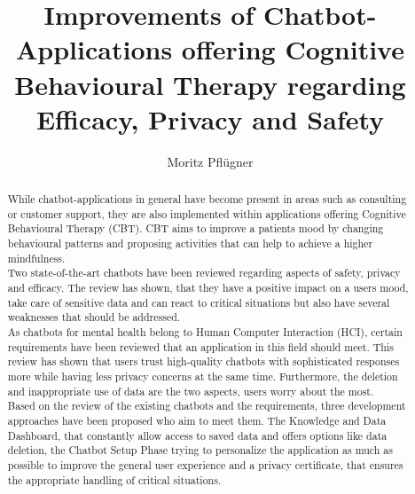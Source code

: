 \documentclass[sigconf, nonacm]{acmart}
\begin{document}
\graphicspath{ {./images/} }

\title{Improvements of Chatbot-Applications offering Cognitive Behavioural Therapy regarding Efficacy, Privacy and Safety}

\author{Moritz Pflügner}


\begin{abstract}
While chatbot-applications in general have become present in areas such as consulting or customer support, they are also implemented
within applications offering Cognitive Behavioural Therapy (CBT). CBT aims to improve a patients mood by changing behavioural patterns and proposing
activities that can help to achieve a higher mindfulness.
\\
Two state-of-the-art chatbots have been reviewed regarding aspects of safety, privacy and efficacy. The review has shown, that they have a positive 
impact on a users mood, take care of sensitive data and can react to critical situations but also have several weaknesses that should be addressed.
\\
As chatbots for mental health belong to Human Computer Interaction (HCI), certain requirements have been reviewed that an application in this field should meet. This review has shown
that users trust high-quality chatbots with sophisticated responses more while having less privacy concerns at the same time. Furthermore, the deletion and 
inappropriate use of data are the two aspects, users worry about the most. 
\\
Based on the review of the existing chatbots and the requirements, three development approaches have been proposed who aim to meet them.
The Knowledge and Data Dashboard, that constantly allow access to saved data and offers options like data deletion, 
the Chatbot Setup Phase trying to personalize the application as much as possible to improve the general user experience and 
a privacy certificate, that ensures the appropriate handling of critical situations.   
\end{abstract}
\end{document}
